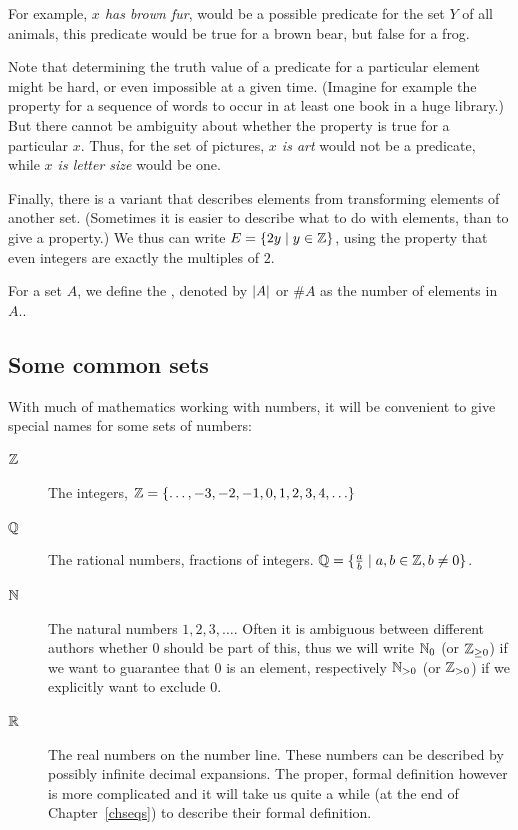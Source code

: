 For example, {\em $x$ has brown fur}, would be a possible predicate for the
set $Y$ of all animals, this predicate would be true for a brown bear, but
false for a frog.

Note that
determining the truth value of a predicate for a particular element
might be hard, or even impossible at a given time. (Imagine for example the
property for a sequence of words to occur in at least one book in a huge
library.)
But there cannot be ambiguity about whether the property is true for a
particular $x$. Thus, for
the set of pictures, {\em $x$ is art} would not be a predicate, while
{\em $x$ is letter size} would be one.
\smallskip

Finally, there is a variant that describes elements from transforming
elements of another set. (Sometimes
it is easier to describe what to do with elements, than to
give a property.) 
We thus can write
$E=\{2y\mid y\in{\mathbb Z}\}$, using the property that even integers are exactly the
multiples of $2$.
\smallskip

For a set $A$, we define the , denoted by $\left|A\right|$ or
$\# A$ as the number of elements in $A$..

\subsection{Some common sets}

With much of mathematics working with numbers, it will be convenient to give
special names for some sets of numbers:
\begin{description}
\item[${\mathbb Z}$] The integers, ${\mathbb Z}=\{\ldots,-3,-2,-1,0,1,2,3,4,\ldots\}$
\item[${\mathbb Q}$] The rational numbers, fractions of integers.
${\mathbb Q}=\{\frac{a}{b}\mid a,b\in{\mathbb Z}, b\not=0\}$.
\item[${\mathbb N}$] The natural numbers $1,2,3,\ldots$. Often it is ambiguous
between different authors whether $0$ should be part of this, thus we will
write ${\mathbb N}_0$ (or ${\mathbb Z}_{\ge 0}$) if we want to guarantee that $0$ is an
element, respectively ${\mathbb N}_{>0}$ (or ${\mathbb Z}_{>0}$) if we explicitly want to
exclude $0$.
\item[${\mathbb R}$] The real numbers on the number line. These numbers can be
described by possibly infinite decimal expansions. The proper, formal
definition however is more complicated and it will take us quite 
a while (at the end of Chapter~\ref{chseqs}) to describe their formal
definition.
\end{description}



